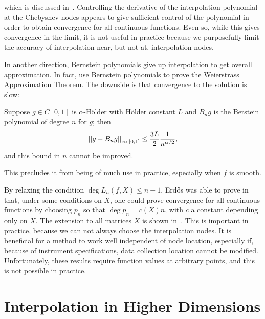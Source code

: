 \noindent
which is discussed in~\cite[Chapter 6]{interpFunctionsBook}.
Controlling the derivative of the interpolation polynomial
at the Chebyshev nodes appears to give sufficient control of the polynomial
in order to obtain convergence for all continuous functions.
Even so, while this gives convergence in the limit,
it is not useful in practice because we purposefully limit the
accuracy of interpolation near, but not at, interpolation nodes.

In another direction, Bernstein polynomials give up interpolation
to get overall approximation.
In fact, \cite{davis_interpolation,rivlin2003introduction}
use Bernstein polynomials to prove the Weierstrass Approximation Theorem.
The downside is that convergence to the solution is slow:

\begin{thm}
\label{thm:berstein_polynomial_error}
Suppose $g\in C[0,1]$ is $\alpha$-H\"{o}lder
with H\"{o}lder constant $L$ and $B_{n}g$ is the Berstein
polynomial of degree $n$ for $g$; then 
%
\begin{equation}
    \left| \left| g - B_{n}g \right| \right|_{\infty,[0,1]} \le
        \frac{3L}{2}\frac{1}{n^{\alpha/2}},
\end{equation}
%
and this bound in $n$ cannot be improved.
\end{thm}

\noindent
This precludes it from being of much use in practice,
especially when $f$ is smooth.

By relaxing the condition $\deg L_{n}(f,X) \le n-1$,
Erd\H{o}s was able to prove in~\cite{erdos1943some} that,
under some conditions on $X$, one could prove convergence
for all continuous functions by choosing $p_{n}$ so that
$\deg p_{n} = c(X)n$, with $c$ a constant depending only on $X$.
The extension to all matrices $X$ is shown
in~\cite[Theorem 2.7]{interpFunctionsBook}.
This is important in practice, because we can not
always choose the interpolation nodes.
It is beneficial for a method to work well independent of
node location, especially if, because of instrument specifications,
data collection location cannot be modified.
Unfortunately, these results require function values at arbitrary points,
and this is not possible in practice.



\section{Interpolation in Higher Dimensions}
\label{sec:Interp_MD}

